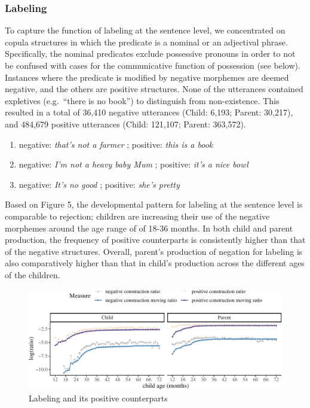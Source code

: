 \documentclass[
  english,
  man,floatsintext]{apa6}
\providecommand{\tightlist}{%
  \setlength{\itemsep}{0pt}\setlength{\parskip}{0pt}}
\begin{document}
\clearpage

\hypertarget{labeling}{%
\subsubsection{Labeling}\label{labeling}}

To capture the function of labeling at the sentence level, we concentrated on copula structures in which the predicate is a nominal or an adjectival phrase. Specifically, the nominal predicates exclude possessive pronouns in order to not be confused with cases for the communicative function of possession (see below). Instances where the predicate is modified by negative morphemes are deemed negative, and the others are positive structures. None of the utterances contained expletives (e.g.~``there is no book'') to distinguish from non-existence. This resulted in a total of 36,410 negative utterances (Child: 6,193; Parent: 30,217), and 484,679 positive utterances (Child: 121,107; Parent: 363,572).

\begin{enumerate}
\def\labelenumi{(\arabic{enumi})}
\setcounter{enumi}{8}
\tightlist
\item
  negative: \emph{that's not a farmer} ; positive: \emph{this is a book}
\item
  negative: \emph{I'm not a heavy baby Mum} ; positive: \emph{it's a nice bowl}
\item
  negative: \emph{It's no good} ; positive: \emph{she's pretty}
\end{enumerate}

Based on Figure 5, the developmental pattern for labeling at the sentence level is comparable to rejection; children are increasing their use of the negative morphemes around the age range of of 18-36 months. In both child and parent production, the frequency of positive counterparts is consistently higher than that of the negative structures. Overall, parent's production of negation for labeling is also comparatively higher than that in child's production across the different ages of the children.

\begin{figure}[H]

{\centering \includegraphics{neg_construction_article_files/figure-latex/learning-1} 

}

\caption{Labeling and its positive counterparts}\label{fig:learning}
\end{figure}
\end{document}
